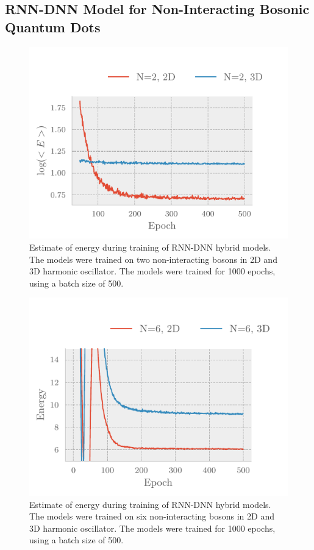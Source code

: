 \subsection{RNN-DNN Model for Non-Interacting Bosonic Quantum Dots}
\begin{figure}[H]
	\includegraphics[]{figures/many_part_nonint_training1.pdf}
	\caption{Estimate of energy during training of RNN-DNN hybrid models. The models were trained on two non-interacting bosons in 2D and 3D harmonic oscillator. The models were trained for 1000 epochs, using a batch size of 500.}
	\label{fig:many_part_nonint_training1}
\end{figure}

\begin{figure}[H]
	\includegraphics[]{figures/many_part_nonint_training2.pdf}
	\caption{Estimate of energy during training of RNN-DNN hybrid models. The models were trained on six non-interacting bosons in 2D and 3D harmonic oscillator. The models were trained for 1000 epochs, using a batch size of 500.}
	\label{fig:many_part_nonint_training2}
\end{figure}

